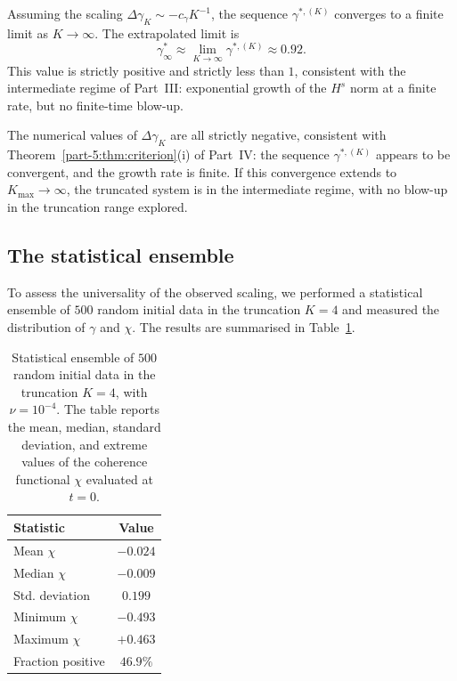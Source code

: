 Assuming the scaling $\Delta\gamma_K \sim -c_\gamma K^{-1}$, the 
sequence $\gamma^{\ast,(K)}$ converges to a finite limit as 
$K\to\infty$. The extrapolated limit is
\begin{equation}\label{part-5:eq:gamma-limit}
\gamma^\ast_\infty \approx \lim_{K\to\infty}\gamma^{\ast,(K)} 
\approx 0.92.
\end{equation}
This value is strictly positive and strictly less than $1$, 
consistent with the intermediate regime of Part~III: exponential 
growth of the $H^s$ norm at a finite rate, but no finite-time 
blow-up.

\begin{remark}\label{part-5:rem:criterion-consistency-V}
The numerical values of $\Delta\gamma_K$ are all strictly negative, 
consistent with Theorem~\ref{part-5:thm:criterion}(i) of Part~IV: the 
sequence $\gamma^{\ast,(K)}$ appears to be convergent, and the 
growth rate is finite. If this convergence extends to 
$K_{\max}\to\infty$, the truncated system is in the intermediate 
regime, with no blow-up in the truncation range explored.
\end{remark}

\subsection{The statistical ensemble}
\label{part-5:ssec:ensemble}

To assess the universality of the observed scaling, we performed a 
statistical ensemble of $500$ random initial data in the truncation 
$K=4$ and measured the distribution of $\gamma$ and $\chi$. The 
results are summarised in Table~\ref{part-5:tab:ensemble}.

\begin{table}[h]
\centering
\caption{Statistical ensemble of $500$ random initial data in the 
truncation $K=4$, with $\nu=10^{-4}$. The table reports the mean, 
median, standard deviation, and extreme values of the coherence 
functional $\chi$ evaluated at $t=0$.}
\label{part-5:tab:ensemble}
\begin{tabular}{lc}
\toprule
Statistic & Value \\
\midrule
Mean $\chi$ & $-0.024$ \\
Median $\chi$ & $-0.009$ \\
Std. deviation & $0.199$ \\
Minimum $\chi$ & $-0.493$ \\
Maximum $\chi$ & $+0.463$ \\
Fraction positive & $46.9\%$ \\
\bottomrule
\end{tabular}
\end{table}

